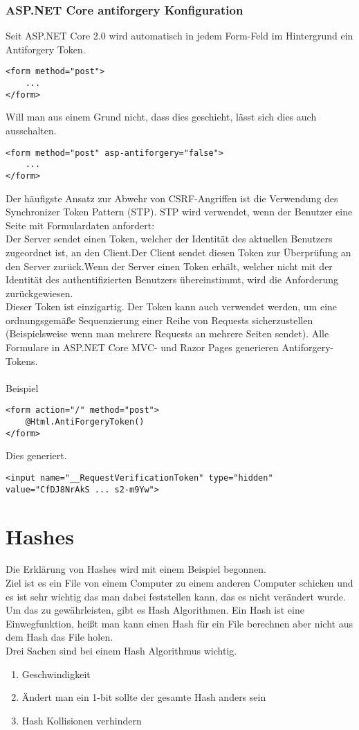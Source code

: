 {\subsubsection{ASP.NET Core antiforgery Konfiguration}
Seit ASP.NET Core 2.0 wird automatisch in jedem Form-Feld im Hintergrund ein Antiforgery Token.
\begin{lstlisting}
<form method="post">
    ...
</form>
\end{lstlisting}
Will man aus einem Grund nicht, dass dies geschieht, lässt sich dies auch ausschalten.
\begin{lstlisting}
<form method="post" asp-antiforgery="false">
    ...
</form>
\end{lstlisting}
Der häufigste Ansatz zur Abwehr von CSRF-Angriffen ist die Verwendung des Synchronizer Token Pattern (STP). STP wird verwendet, wenn der Benutzer eine Seite mit Formulardaten anfordert:\\Der Server sendet einen Token, welcher der Identität des aktuellen Benutzers zugeordnet ist, an den Client.Der Client sendet diesen Token zur Überprüfung an den Server zurück.Wenn der Server einen Token erhält, welcher nicht mit der Identität des authentifizierten Benutzers übereinstimmt, wird die Anforderung zurückgewiesen.\\Dieser Token ist einzigartig. Der Token kann auch verwendet werden, um eine ordnungsgemäße Sequenzierung einer Reihe von Requests sicherzustellen (Beispielsweise wenn man mehrere Requests an mehrere Seiten sendet). Alle Formulare in ASP.NET Core MVC- und Razor Pages generieren Antiforgery-Tokens.\\ \\Beispiel\\
\begin{lstlisting}
<form action="/" method="post">
    @Html.AntiForgeryToken()
</form>
\end{lstlisting}
Dies generiert.\\
\begin{lstlisting}
<input name="__RequestVerificationToken" type="hidden" value="CfDJ8NrAkS ... s2-m9Yw">
\end{lstlisting}
\section{Hashes}
\label{hash-expl}
Die Erklärung von Hashes wird mit einem Beispiel begonnen.
\\Ziel ist es ein File von einem Computer zu einem anderen Computer schicken und es ist sehr wichtig das man dabei feststellen kann, das es nicht verändert wurde. Um das zu gewährleisten, gibt es Hash Algorithmen. Ein Hash ist eine Einwegfunktion, heißt man kann einen Hash für ein File berechnen aber nicht aus dem Hash das File holen.\\
Drei Sachen sind bei einem Hash Algorithmus wichtig.
\begin{enumerate}
\item Geschwindigkeit
\item Ändert man ein 1-bit sollte der gesamte Hash anders sein
\item Hash Kollisionen verhindern 
\end{enumerate}
}

